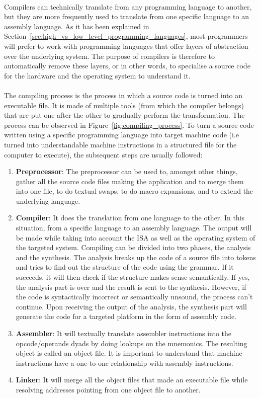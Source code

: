 \paragraph{}
Compilers can technically translate from any programming language to another, but they are more frequently used to translate from one specific language to an assembly language. As it has been explained in Section~\ref{sec:high_vs_low_level_programming_languages}, most programmers will prefer to work with programming languages that offer layers of abstraction over the underlying system. The purpose of compilers is therefore to automatically remove these layers, or in other words, to specialise a source code for the hardware and the operating system to understand it.

\paragraph{}
The compiling process is the process in which a source code is turned into an executable file. It is made of multiple tools (from which the compiler belongs) that are put one after the other to gradually perform the transformation. The process can be observed in Figure~\ref{fig:compiling_process}. To turn a source code written using a specific programming language into target machine code (i.e turned into understandable machine instructions in a structured file for the computer to execute), the subsequent steps are usually followed:
\begin{enumerate}
	\item \textbf{Preprocessor}: The preprocessor can be used to, amongst other things, gather all the source code files making the application and to merge them into one file, to do textual swaps, to do macro expansions, and to extend the underlying language.
	\item \textbf{Compiler}: It does the translation from one language to the other. In this situation, from a specific language to an assembly language. The output will be made while taking into account the ISA as well as the operating system of the targeted system. Compiling can be divided into two phases, the analysis and the synthesis. The analysis breaks up the code of a source file into tokens and tries to find out the structure of the code using the grammar. If it succeeds, it will then check if the structure makes sense semantically. If yes, the analysis part is over and the result is sent to the synthesis. However, if the code is syntactically incorrect or semantically unsound, the process can't continue. Upon receiving the output of the analysis, the synthesis part will generate the code for a targeted platform in the form of assembly code.
	\item \textbf{Assembler}: It will textually translate assembler instructions into the opcode/operands dyads by doing lookups on the mnemonics. The resulting object is called an object file. It is important to understand that machine instructions have a one-to-one relationship with assembly instructions.
	\item \textbf{Linker}: It will merge all the object files that made an executable file while resolving addresses pointing from one object file to another.
\end{enumerate}

